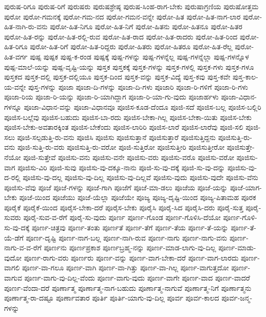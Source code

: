 {ಪುರುಷ-ರಿಗೂ
ಪುರುಷ-ರಿಗೆ
ಪುರುಷರು
ಪುರುಷಶ್ರೇಷ್ಠ
ಪುರುಷ-ಸಿಂಹ-ರಾಗ-ಬೇಕು
ಪುರುಷಾಗ್ರಣಿಯ
ಪುರುಷೋತ್ತಮ
ಪುರೋ
ಪುರೋ-ಗಮನಕ್ಕೆ
ಪುರೋ-ಗಮ-ನದ
ಪುರೋ-ಗಮನ-ವನ್ನೇ
ಪುರೋ-ಹಿತ
ಪುರೋ-ಹಿತ-ನಾಗ-ಲಾರ
ಪುರೋ-ಹಿತ-ನಾಗಿ-ರು-ವನು
ಪುರೋ-ಹಿತ-ನಿಗೂ
ಪುರೋ-ಹಿತ-ನಿಗೆ
ಪುರೋ-ಹಿತನು
ಪುರೋ-ಹಿತನೂ
ಪುರೋ-ಹಿತರ
ಪುರೋ-ಹಿತ-ರನ್ನು
ಪುರೋ-ಹಿತ-ರಲ್ಲಿ-ರುವ
ಪುರೋ-ಹಿತ-ರಾದ
ಪುರೋ-ಹಿತ-ರಾದರು
ಪುರೋ-ಹಿತ-ರಿಂದ
ಪುರೋ-ಹಿತ-ರಿಗೂ
ಪುರೋ-ಹಿತ-ರಿಗೆ
ಪುರೋ-ಹಿತ-ರಿದ್ದರು
ಪುರೋ-ಹಿತರು
ಪುರೋ-ಹಿತರೂ
ಪುರೋ-ಹಿತ-ರೆಲ್ಲ
ಪುರೋ-ಹಿತ-ವರ್ಗ
ಪುಷ್ಪ
ಪುಷ್ಪಕ
ಪುಷ್ಪ-ಕ-ರಂಡ
ಪುಷ್ಪಕ್ಕೆ
ಪುಷ್ಪ-ಗಳನ್ನು
ಪುಷ್ಪ-ಗಳನ್ನೆಲ್ಲ
ಪುಷ್ಪ-ಗಳನ್ನೆಲ್ಲಾ
ಪುಷ್ಪ-ಗಳನ್ನೊಳ
ಪುಷ್ಪ-ಮಾಲೆ-ಯನ್ನು
ಪುಷ್ಪ-ವೃಷ್ಟಿ-ಯನ್ನು
ಪುಸ್ತಕ
ಪುಸ್ತಕಕ್ಕೆ
ಪುಸ್ತಕ-ಗಳನ್ನು
ಪುಸ್ತಕ-ಗಳಲ್ಲಿ
ಪುಸ್ತಕ-ಗಳು
ಪುಸ್ತಕ-ಗಳೂ
ಪುಸ್ತಕದ
ಪುಸ್ತಕ-ದಲ್ಲಿ
ಪುಸ್ತಕ-ದಲ್ಲಿಯೂ
ಪುಸ್ತಕ-ದಿಂದ
ಪುಸ್ತಕ-ವನ್ನು
ಪುಸ್ತಕ-ವಿದ್ಯೆ
ಪುಸ್ತ-ಕವು
ಪುಸ್ತ-ಕವೇ
ಪುಸ್ತ-ಕಾಲ-ಯ-ವನ್ನೇ
ಪುಸ್ತ-ಗಳನ್ನು
ಪೂಜಾ
ಪೂಜಾ-ದಿ-ಗಳನ್ನು
ಪೂಜಾ-ದಿ-ಗಳು
ಪೂಜಾರಿ
ಪೂಜಾ-ರಿ-ಗಳಿಗೆ
ಪೂಜಾ-ರಿ-ಗಳು
ಪೂಜಾ-ರಿಯ
ಪೂಜಾ-ರಿ-ಯನ್ನು
ಪೂಜಾ-ರಿ-ಯಾಗಿದ್ದಾಗ
ಪೂಜಾ-ರಿ-ಯಾ-ಗು-ವುದು
ಪೂಜಾರ್ಹಳು
ಪೂಜಾ-ವಿಧಾನ-ಗಳನ್ನೂ
ಪೂಜಾ-ವಿಧಾನ-ವನ್ನು
ಪೂಜಾ-ವಿಧಾನವೂ
ಪೂಜಿಸ-ಕೂಡ-ದೆಂದೂ
ಪೂಜಿ-ಸದೆ
ಪೂಜಿಸ-ಬಲ್ಲ
ಪೂಜಿಸ-ಬಲ್ಲಿರಿ
ಪೂಜಿಸ-ಬಲ್ಲೆವು
ಪೂಜಿಸ-ಬಹುದು
ಪೂಜಿಸ-ಬಾ-ರದು
ಪೂಜಿಸ-ಬೇಕಾ-ಗಿಲ್ಲ
ಪೂಜಿಸ-ಬೇಕಾ-ಯಿತು
ಪೂಜಿಸ-ಬೇಕು
ಪೂಜಿಸ-ಬೇಕು-ಅವತಾರಕ್ಕಿಂತ
ಪೂಜಿಸ-ಬೇಕೆಂದು
ಪೂಜಿಸ-ಲಾರಿರಿ
ಪೂಜಿಸ-ಲಾರೆ
ಪೂಜಿಸ-ಲಾರೆವು
ಪೂಜಿ-ಸಲಿ
ಪೂಜಿ-ಸಲು
ಪೂಜಿ-ಸಲ್ಪಡುತ್ತಿ-ರು-ವನು
ಪೂಜಿಸಿ
ಪೂಜಿಸು
ಪೂಜಿಸುತ್ತಾನೆ
ಪೂಜಿಸುತ್ತಾರೆ
ಪೂಜಿಸುತ್ತಿದ್ದನು
ಪೂಜಿಸುತ್ತಿ-ರು-ವನು
ಪೂಜಿ-ಸುತ್ತಿ-ರು-ವರು
ಪೂಜಿಸುತ್ತಿ-ರು-ವರೋ
ಪೂಜಿ-ಸುತ್ತಿರೋ
ಪೂಜಿಸುತ್ತೀರಿ
ಪೂಜಿಸುತ್ತೀರೋ
ಪೂಜಿಸುತ್ತೇ-ನೆಯೋ
ಪೂಜಿ-ಸುತ್ತೇವೆ
ಪೂಜಿಸು-ವನು
ಪೂಜಿಸು-ವನೇ
ಪೂಜಿಸು-ವರು
ಪೂಜಿಸು-ವರೊ
ಪೂಜಿಸು-ವರೋ
ಪೂಜಿಸು-ವಾಗ
ಪೂಜಿಸು-ವಿರಿ
ಪೂಜಿ-ಸುವು
ಪೂಜಿಸು-ವು-ದಕ್ಕೂ-ನಾನು
ಪೂಜಿ-ಸು-ವು-ದಕ್ಕೆ
ಪೂಜಿ-ಸು-ವು-ದನ್ನು
ಪೂಜಿಸು-ವು-ದ-ರಲ್ಲಿ
ಪೂಜಿಸು-ವು-ದಲ್ಲ
ಪೂಜಿಸು-ವು-ದಿಲ್ಲ
ಪೂಜಿಸು-ವು-ದಿಲ್ಲವೆ
ಪೂಜಿಸು-ವುದು
ಪೂಜಿಸು-ವುದೇ
ಪೂಜಿಸು-ವೆನು
ಪೂಜಿಸು-ವೆವು
ಪೂಜೆ
ಪೂಜೆ-ಗಳನ್ನು
ಪೂಜೆ-ಗಾಗಿ
ಪೂಜೆಗೆ
ಪೂಜೆ-ಮಾ-ಡಲು
ಪೂಜೆಯ
ಪೂಜೆ-ಯನ್ನು
ಪೂಜೆ-ಯಾಗ-ಬೇಕು
ಪೂಜೆ-ಯಿಂದ
ಪೂಜೆಯು
ಪೂಜೆ-ಯೆಲ್ಲಾ
ಪೂಜೆಯೇ
ಪೂಜ್ಯ
ಪೂಜ್ಯ-ದೃಷ್ಟಿ-ಯಿಂದ
ಪೂಜ್ಯ-ಪಿತಾಮಹ
ಪೂರಕ
ಪೂರೈಕೆ
ಪೂರೈಕೆ-ಯಿಂದ
ಪೂರೈಸ-ಬೇಕಾ-ದರೆ
ಪೂರೈಸ-ಬೇಕು
ಪೂರೈಸಿ
ಪೂರೈ-ಸಿದ
ಪೂರೈಸಿ-ದರು
ಪೂರೈ-ಸುತ್ತ
ಪೂರೈ-ಸುವರು
ಪೂರೈ-ಸುವ-ವ-ರೆಗೆ
ಪೂರೈ-ಸು-ವುದು
ಪೂರ್ಣ
ಪೂರ್ಣ-ಗೊಂಡ
ಪೂರ್ಣ-ಗೊಳಿಸಿ-ದೆಯೋ
ಪೂರ್ಣ-ಗೊಳಿ-ಸು-ವು-ದಕ್ಕೆ
ಪೂರ್ಣ-ಚಿತ್ರವು
ಪೂರ್ಣ-ತಂತು
ಪೂರ್ಣತೆ
ಪೂರ್ಣ-ತೆಗೆ
ಪೂರ್ಣ-ತೆಯ
ಪೂರ್ಣ-ತೆ-ಯನ್ನು
ಪೂರ್ಣ-ತೆ-ಯೆ-ಡೆಗೆ
ಪೂರ್ಣ-ದೃಷ್ಟಿ
ಪೂರ್ಣ-ನಾಗ-ಬಲ್ಲ
ಪೂರ್ಣ-ನಾಗಿ-ರುವ
ಪೂರ್ಣ-ನಾಗು
ಪೂರ್ಣ-ನಾಗು-ವನು
ಪೂರ್ಣ-ನಾಗು-ವ-ವ-ರೆಗೆ
ಪೂರ್ಣನು
ಪೂರ್ಣಪ್ರಕಾಶ
ಪೂರ್ಣಬ್ರಹ್ಮ-ನನ್ನು
ಪೂರ್ಣ-ಮಾಡ-ಲಾಗು-ವು-ದಿಲ್ಲ
ಪೂರ್ಣ-ಮಾಡು-ವುದೋ
ಪೂರ್ಣ-ರಾಗು-ವರು
ಪೂರ್ಣರು
ಪೂರ್ಣ-ವನ್ನು
ಪೂರ್ಣ-ವಾಗ-ಬೇಕಾ-ದರೆ
ಪೂರ್ಣ-ವಾಗ-ಲಾರದು
ಪೂರ್ಣ-ವಾಗಲಿ
ಪೂರ್ಣ-ವಾ-ಗಲೂ
ಪೂರ್ಣ-ವಾಗಿ
ಪೂರ್ಣ-ವಾ-ಗಿತ್ತು
ಪೂರ್ಣ-ವಾ-ಗಿಲ್ಲ
ಪೂರ್ಣ-ವಾಗುತ್ತದೋ
ಪೂರ್ಣ-ವಾಗುವ
ಪೂರ್ಣ-ವಾಗು-ವು-ದಿಲ್ಲ-ವೆಂದು
ಪೂರ್ಣ-ವಾಗು-ವುದು
ಪೂರ್ಣ-ವಾಗೇ
ಪೂರ್ಣ-ವಾದ
ಪೂರ್ಣ-ವಾದರೆ
ಪೂರ್ಣ-ವೆಂದಾ-ದರೆ
ಪೂರ್ಣಾತ್ಮ
ಪೂರ್ಣಾತ್ಮ-ನಾಗ-ಬಹುದು
ಪೂರ್ಣಾತ್ಮ-ನಾಗುವೆ
ಪೂರ್ಣಾತ್ಮ-ನಿಗೆ
ಪೂರ್ಣಾತ್ಮನು
ಪೂರ್ಣಾತ್ಮ-ರಾ-ದಷ್ಟೂ
ಪೂರ್ಣಾವತಾರ
ಪೂರ್ತಿ
ಪೂರ್ತಿ-ಯಾಗು-ವು-ದಿಲ್ಲ
ಪೂರ್ವ
ಪೂರ್ವ-ಕಾಲದ
ಪೂರ್ವ-ಜನ್ಮ-ಗಳನ್ನು
}
